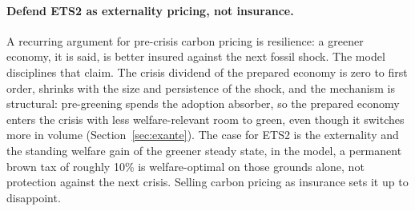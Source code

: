 \paragraph{Defend ETS2 as externality pricing, not insurance.} A recurring
argument for pre-crisis carbon pricing is resilience: a greener economy, it is
said, is better insured against the next fossil shock. The model disciplines
that claim. The crisis dividend of the prepared economy is zero to first order,
shrinks with the size and persistence of the shock, and the mechanism is
structural: pre-greening spends the adoption absorber, so the prepared economy
enters the crisis with less welfare-relevant room to green, even though it
switches more in volume (Section~\ref{sec:exante}). The case for ETS2 is the
externality and the standing welfare gain of the greener steady state, in the
model, a permanent brown tax of roughly 10\% is welfare-optimal on those
grounds alone, not protection against the next crisis. Selling carbon pricing
as insurance sets it up to disappoint.
